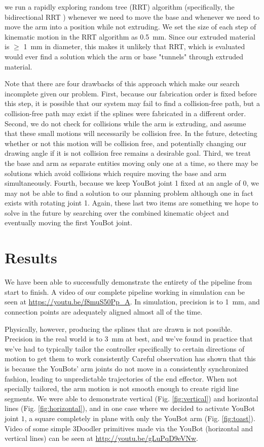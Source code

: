 \documentclass[conference]{acmsiggraph}
\begin{document}
we run a rapidly exploring random tree (RRT) \cite{RRT} algorithm (specifically, the bidirectional RRT \cite{biRRT}) whenever we need to move the base and whenever we need to move the arm into a position while not extruding.  We set the size of each step of kinematic motion in the RRT algorithm as 0.5~mm.  Since our extruded material is $\geq$ 1~mm in diameter, this makes it unlikely that RRT, which is evaluated would ever find a solution which the arm or base "tunnels" through extruded material.

Note that there are four drawbacks of this approach which make our search incomplete given our problem. First, because our fabrication order is fixed before this step, it is possible that our system may fail to find a collision-free path, but a collision-free path may exist if the splines were fabricated in a different order.  Second, we do not check for collisions while the arm is extruding, and assume that these small motions will necessarily be collision free.  In the future, detecting whether or not this motion will be collision free, and potentially changing our drawing angle if it is not collision free remains a desirable goal.  Third, we treat the base and arm as separate entities moving only one at a time, so there may be solutions which avoid collisions which require moving the base and arm simultaneously.  Fourth, because we keep YouBot joint 1 fixed at an angle of $0$, we may not be able to find a solution to our planning problem although one in fact exists with rotating joint 1.  Again, these last two items are something we hope to solve in the future by searching over the combined kinematic object and eventually moving the first YouBot joint.

\section{Results}

We have been able to successfully demonstrate the entirety of the pipeline from start to finish.  A video of our complete pipeline working in simulation can be seen at \url{https://youtu.be/f8muS50Pp_A}.  In simulation, precision is to 1~mm, and connection points are adequately aligned almost all of the time.

Physically, however, producing the splines that are drawn is not possible.  Precision in the real world is to 3~mm at best, and we've found in practice that we've had to typically tailor the controller specifically to certain directions of motion to get them to work consistently  Careful observation has shown that this is because the YouBots' arm joints do not move in a consistently synchronized fashion, leading to unpredictable trajectories of the end effector.  When not specially tailored, the arm motion is not smooth enough to create rigid line segments.  We were able to demonstrate vertical (Fig. \ref{fig:vertical}) and horizontal lines (Fig. \ref{fig:horizontal}), and in one case where we decided to activate YouBot joint $1$, a square completely in plane with only the YouBot arm (Fig. \ref{fig:toast}).  Video of some simple 3Doodler primitives made via the YouBot (horizontal and vertical lines) can be seen at \url{http://youtu.be/gLuPqD9eVNw}.
\end{document}
